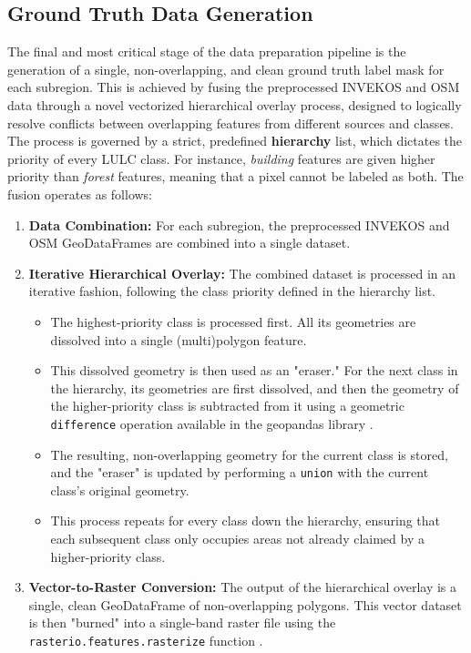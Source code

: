 \documentclass{report}
\begin{document}
\subsection{Ground Truth Data Generation}
\label{seq:ground_truth_generation}
The final and most critical stage of the data preparation pipeline is the generation of a single, non-overlapping, and clean ground truth label mask for each subregion. This is achieved by fusing the preprocessed INVEKOS and OSM data through a novel vectorized hierarchical overlay process, designed to logically resolve conflicts between overlapping features from different sources and classes.
The process is governed by a strict, predefined \textbf{hierarchy} list, which dictates the priority of every LULC class. For instance, \textit{building} features are given higher priority than \textit{forest} features, meaning that a pixel cannot be labeled as both. The fusion operates as follows:
\begin{enumerate}
    \item \textbf{Data Combination:} For each subregion, the preprocessed INVEKOS and OSM GeoDataFrames are combined into a single dataset.
    \item \textbf{Iterative Hierarchical Overlay:} The combined dataset is processed in an iterative fashion, following the class priority defined in the hierarchy list.
    \begin{itemize}
        \item The highest-priority class is processed first. All its geometries are dissolved into a single (multi)polygon feature.
        \item  This dissolved geometry is then used as an "eraser." For the next class in the hierarchy, its geometries are first dissolved, and then the geometry of the higher-priority class is subtracted from it using a geometric \texttt{difference} operation available in the geopandas library \parencite{JordahlEtAlgeopandasgeopandasv0812020}.
        \item  The resulting, non-overlapping geometry for the current class is stored, and the "eraser" is updated by performing a \texttt{union} with the current class's original geometry.
        \item  This process repeats for every class down the hierarchy, ensuring that each subsequent class only occupies areas not already claimed by a higher-priority class.
    \end{itemize}
    \item \textbf{Vector-to-Raster Conversion:} The output of the hierarchical overlay is a single, clean GeoDataFrame of non-overlapping polygons. This vector dataset is then "burned" into a single-band raster file using the \texttt{rasterio.features.rasterize} function \parencite{GilliesRasteriogeospatialrasterPythonprogrammers2013}. 
\end{enumerate}
\end{document}
